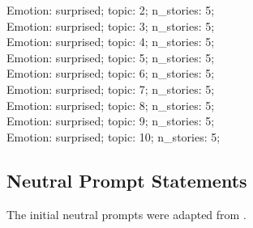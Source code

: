 \begin{anthropicbox}
    Emotion: surprised; topic: 2; n\_stories: 5;\\
    Emotion: surprised; topic: 3; n\_stories: 5;\\
    Emotion: surprised; topic: 4; n\_stories: 5;\\
    Emotion: surprised; topic: 5; n\_stories: 5;\\
    Emotion: surprised; topic: 6; n\_stories: 5;\\
    Emotion: surprised; topic: 7; n\_stories: 5;\\
    Emotion: surprised; topic: 8; n\_stories: 5;\\
    Emotion: surprised; topic: 9; n\_stories: 5;\\
    Emotion: surprised; topic: 10; n\_stories: 5;

\end{anthropicbox}

\subsection{Neutral Prompt Statements}
\label{apdx:neutral-prompt}

The initial neutral prompts were adapted from \cite{hsieh_replicating_2026}.

